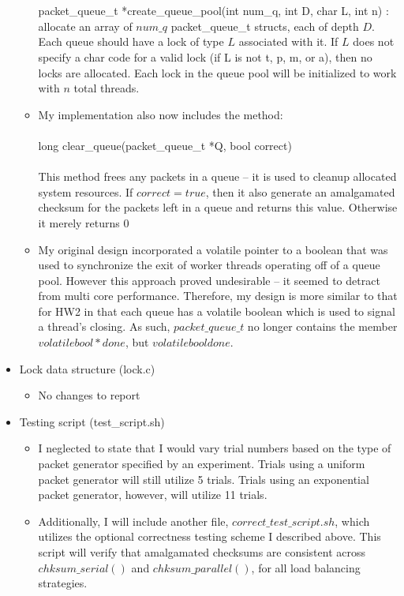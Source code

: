 \documentclass[]{article}
\begin{document}
\begin{itemize}
\begin{itemize}
		\\\\
		packet\_queue\_t *create\_queue\_pool(int num\_q, int D, char L, int n) : allocate an array of $num\_q$ packet\_queue\_t structs, each of depth $D$. Each queue should have a lock of type $L$ associated with it. If $L$ does not specify a char code for a valid lock (if L is not t, p, m, or a), then no locks are allocated. Each lock in the queue pool will be initialized to work with $n$ total threads.
		\item My implementation also now includes the method:
		\\\\
		long clear\_queue(packet\_queue\_t *Q, bool correct) 
		\\\\
		This method frees any packets in a queue -- it is used to cleanup allocated system resources. If $correct = true$, then it also generate an amalgamated checksum for the packets left in a queue and returns this value. Otherwise it merely returns $0$ 
		\item My original design incorporated a volatile pointer to a boolean that was used to synchronize the exit of worker threads operating off of a queue pool. However this approach proved undesirable -- it seemed to detract from multi core performance. Therefore, my design is more similar to that for HW2 in that each queue has a volatile boolean which is used to signal a thread's closing. As such, $packet\_queue\_t$ no longer contains the member $volatile bool *done$, but $volatile bool done$.
	\end{itemize}
	\item Lock data structure (lock.c)
	\begin{itemize}
		\item No changes to report
	\end{itemize}
	\item Testing script (test\_script.sh)
	\begin{itemize}
		\item I neglected to state that I would vary trial numbers based on the type of packet generator specified by an experiment. Trials using a uniform packet generator will still utilize 5 trials. Trials using an exponential packet generator, however, will utilize 11 trials.
		\item Additionally, I will include another file, $correct\_test\_script.sh$, which utilizes the optional correctness testing scheme I described above. This script will verify that amalgamated checksums are consistent across $chksum\_serial()$ and $chksum\_parallel()$, for all load balancing strategies.

\end{itemize}
\end{itemize}
\end{document}
